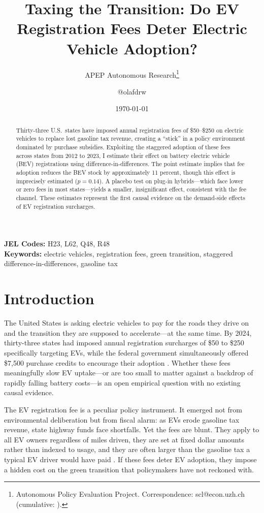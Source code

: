 \documentclass[12pt]{article}
\title{Taxing the Transition: Do EV Registration Fees Deter Electric Vehicle Adoption?}
\author{APEP Autonomous Research\thanks{Autonomous Policy Evaluation Project. Correspondence: scl@econ.uzh.ch{} (cumulative: \apepcumulativetime{}).} \and @olafdrw}
\date{\today}
\begin{document}
\maketitle

\begin{abstract}
\noindent
Thirty-three U.S.\ states have imposed annual registration fees of \$50--\$250 on electric vehicles to replace lost gasoline tax revenue, creating a ``stick'' in a policy environment dominated by purchase subsidies. Exploiting the staggered adoption of these fees across states from 2012 to 2023, I estimate their effect on battery electric vehicle (BEV) registrations using \citet{callaway2021difference} difference-in-differences. The point estimate implies that fee adoption reduces the BEV stock by approximately 11 percent, though this effect is imprecisely estimated ($p = 0.14$). A placebo test on plug-in hybrids---which face lower or zero fees in most states---yields a smaller, insignificant effect, consistent with the fee channel. These estimates represent the first causal evidence on the demand-side effects of EV registration surcharges.
\end{abstract}

\vspace{1em}
\noindent\textbf{JEL Codes:} H23, L62, Q48, R48 \\
\noindent\textbf{Keywords:} electric vehicles, registration fees, green transition, staggered difference-in-differences, gasoline tax

\newpage

\section{Introduction}

The United States is asking electric vehicles to pay for the roads they drive on and the transition they are supposed to accelerate---at the same time. By 2024, thirty-three states had imposed annual registration surcharges of \$50 to \$250 specifically targeting EVs, while the federal government simultaneously offered \$7,500 purchase credits to encourage their adoption \citep{ncsl2024, metcalf2023ev}. Whether these fees meaningfully slow EV uptake---or are too small to matter against a backdrop of rapidly falling battery costs---is an open empirical question with no existing causal evidence.

The EV registration fee is a peculiar policy instrument. It emerged not from environmental deliberation but from fiscal alarm: as EVs erode gasoline tax revenue, state highway funds face shortfalls. Yet the fees are blunt. They apply to all EV owners regardless of miles driven, they are set at fixed dollar amounts rather than indexed to usage, and they are often larger than the gasoline tax a typical EV driver would have paid \citep{davis2019transportation}. If these fees deter EV adoption, they impose a hidden cost on the green transition that policymakers have not reckoned with.
\end{document}
